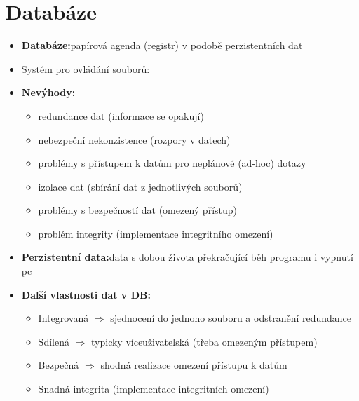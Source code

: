 \documentclass[a4paper,10pt]{article}
\newcommand{\pojem}[2]{\item \textbf{#1:}\quad #2}
\newcommand{\tedy}{$\Rightarrow$ }
\begin{document}
	\section{Databáze}
		\begin{itemize}
			\pojem{Databáze}{papírová agenda (registr) v podobě perzistentních dat}
			\item Systém pro ovládání souborů:
			\pojem{Nevýhody}
			\begin{itemize}
				\item redundance dat (informace se opakují)
				\item nebezpeční nekonzistence (rozpory v datech)
				\item problémy s přístupem k datům pro neplánové (ad-hoc) dotazy
				\item izolace dat (sbírání dat z jednotlivých souborů)
				\item problémy s bezpečností dat (omezený přístup)
				\item problém integrity (implementace integritního omezení)
			\end{itemize}

			\pojem{Perzistentní data}{data s dobou života překračující běh programu i vypnutí pc}
			\pojem{Další vlastnosti dat v DB}
			\begin{itemize}
				\item Integrovaná \tedy sjednocení do jednoho souboru a odstranění redundance
				\item Sdílená \tedy typicky víceuživatelská (třeba omezeným přístupem)
				\item Bezpečná \tedy shodná realizace omezení přístupu k datům
				\item Snadná integrita (implementace integritních omezení)
			\end{itemize}


\end{itemize}
\end{document}
